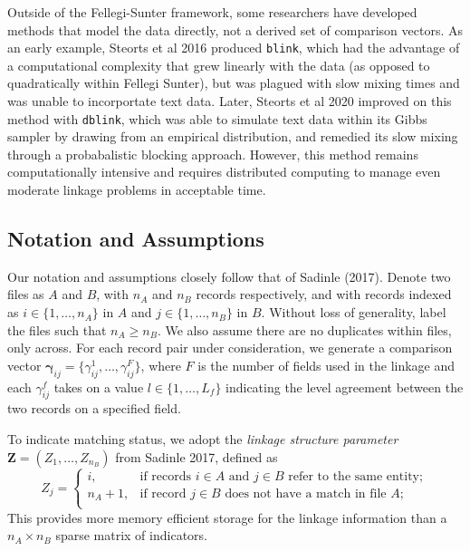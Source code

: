 \documentclass[
  12pt,
]{article}
\begin{document}
Outside of the Fellegi-Sunter framework, some researchers have developed
methods that model the data directly, not a derived set of comparison
vectors. As an early example, Steorts et al 2016 produced
\texttt{blink}, which had the advantage of a computational complexity
that grew linearly with the data (as opposed to quadratically within
Fellegi Sunter), but was plagued with slow mixing times and was unable
to incorportate text data. Later, Steorts et al 2020 improved on this
method with \texttt{dblink}, which was able to simulate text data within
its Gibbs sampler by drawing from an empirical distribution, and
remedied its slow mixing through a probabalistic blocking approach.
However, this method remains computationally intensive and requires
distributed computing to manage even moderate linkage problems in
acceptable time.

\hypertarget{notation-and-assumptions}{%
\subsection{Notation and Assumptions}\label{notation-and-assumptions}}

Our notation and assumptions closely follow that of Sadinle (2017).
Denote two files as \(A\) and \(B\), with \(n_A\) and \(n_B\) records
respectively, and with records indexed as \(i \in \{1, \ldots, n_A\}\)
in \(A\) and \(j \in \{1, \ldots, n_B\}\) in \(B\). Without loss of
generality, label the files such that \(n_A \geq n_B\). We also assume
there are no duplicates within files, only across. For each record pair
under consideration, we generate a comparison vector
\(\boldsymbol{\gamma}_{ij} = \{\gamma_{ij}^1, \ldots, \gamma_{ij}^F\}\),
where \(F\) is the number of fields used in the linkage and each
\(\gamma_{ij}^f\) takes on a value \(l \in \{1, \ldots, L_f\}\)
indicating the level agreement between the two records on a specified
field.

To indicate matching status, we adopt the \emph{linkage structure
parameter} \(\mathbf{Z} = (Z_1, \ldots, Z_{n_B})\) from Sadinle 2017,
defined as \[Z_j=\begin{cases} 
    i,  & \text{if records } i\in A \text{ and } j\in B \text{ refer to the same entity}; \\
    n_A + 1,  & \text{if record } j\in B \text{ does not have a match in file } A; \\
\end{cases}\] This provides more memory efficient storage for the
linkage information than a \(n_A \times n_B\) sparse matrix of
indicators.
\end{document}

